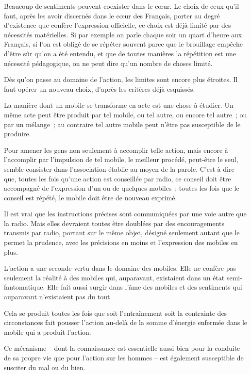 \documentclass[french,twoside]{book} %
\begin{document}
\par
Beaucoup de sentiments peuvent coexister dans le cœur. Le choix de ceux qu'il faut, après les avoir discernés dans le cœur des Français, porter au degré d'existence que confère l'expression officielle, ce choix est déjà limité par des nécessités matérielles. Si par exemple on parle chaque soir un quart d'heure aux Français, si l'on est obligé de se répéter souvent parce que le brouillage empêche d'être sûr qu'on a été entendu, et que de toutes manières la répétition est une nécessité pédagogique, on ne peut dire qu'un nombre de choses limité.\par
Dès qu'on passe au domaine de l'action, les limites sont encore plus étroites. Il faut opérer un nouveau choix, d'après les critères déjà esquissés.\par
La manière dont un mobile se transforme en acte est une chose à étudier. Un même acte peut être produit par tel mobile, ou tel autre, ou encore tel autre ; ou par un mélange ; au contraire tel autre mobile peut n'être pas susceptible de le produire.\par
Pour amener les gens non seulement à accomplir telle action, mais encore à l'accomplir par l'impulsion de tel mobile, le meilleur procédé, peut-être le seul, semble consister dans l'association établie au moyen de la parole. C'est-à-dire que, toutes les fois qu'une action est conseillée par radio, ce conseil doit être accompagné de l'expression d'un ou de quelques mobiles ; toutes les fois que le conseil est répété, le mobile doit être de nouveau exprimé.\par
Il est vrai que les instructions précises sont communiquées par une voie autre que la radio. Mais elles devraient toutes être doublées par des encouragements transmis par radio, portant sur le même objet, désigné seulement autant que le permet la prudence, avec les précisions en moins et l'expression des mobiles en plus.\par
L'action a une seconde vertu dans le domaine des mobiles. Elle ne confère pas seulement la réalité à des mobiles qui, auparavant, existaient dans un état semi-fantomatique. Elle fait aussi surgir dans l'âme des mobiles et des sentiments qui auparavant n'existaient pas du tout.\par
Cela se produit toutes les fois que soit l'entraînement soit la contrainte des circonstances fait pousser l'action au-delà de la somme d'énergie enfermée dans le mobile qui a produit l'action.\par
Ce mécanisme – dont la connaissance est essentielle aussi bien pour la conduite de sa propre vie que pour l'action sur les hommes – est également susceptible de susciter du mal ou du bien.\par
\end{document}
